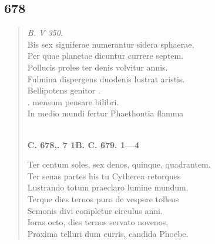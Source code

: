 \documentclass[11pt, a4paper]{report}
\begin{document}
            \subsection*{678}
      \begin{verse}
      \textit{B. V 350.} \\ Bis sex signiferae numerantur sidera sphaerae, \\ Per quae planetae dicuntur currere septem. \\ Pollucis proles ter denis volvitur annis. \\ Fulmina dispergens duodenis lustrat aristis. \\ Bellipotens genitor . \\ . mensum pensare bilibri. \\ In medio mundi fertur Phaethontia flamma \\ 
        ﻿\pagebreak 
    \begin{center} \textbf{C. 678,. 7 1B. C. 679. 1—4} \end{center} \marginpar{[154]} Ter centum soles, sex denos, quinque, quadrantem. \\ Ter senas partes his  \lbrack tu \rbrack  Cytherea retorques \\ Lustrando totum praeclaro lumine mundum. \\ Terque dies ternos puro de vespere tollens \\ Semonis divi completur circulus anni. \\ Ioras octo, dies ternos servato novenos, \\ Proxima telluri dum curris, candida Phoebe. \\ 
      \end{verse}
  
\end{document}
